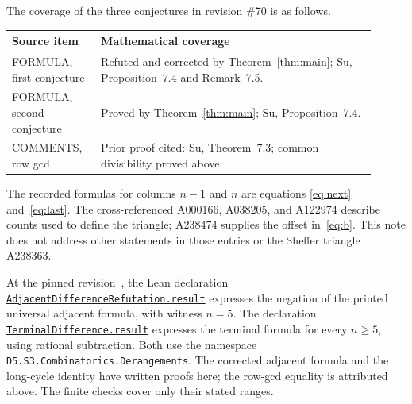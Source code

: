 \documentclass[11pt]{article}
\begin{document}
The coverage of the three conjectures in revision \#70 is as follows.
\begin{center}
\small
\begin{tabular}{p{0.22\linewidth}p{0.69\linewidth}}
\toprule
Source item & Mathematical coverage\\
\midrule
FORMULA, first conjecture & Refuted and corrected by Theorem~\ref{thm:main};
Su, Proposition~7.4 and Remark~7.5.\\
FORMULA, second conjecture & Proved by Theorem~\ref{thm:main};
Su, Proposition~7.4.\\
COMMENTS, row gcd & Prior proof cited: Su, Theorem~7.3;
common divisibility proved above.\\
\bottomrule
\end{tabular}
\end{center}
The recorded formulas for columns $n-1$ and $n$ are equations
\eqref{eq:next} and~\eqref{eq:last}. The cross-referenced A000166,
A038205, and A122974 describe counts used to define the triangle;
A238474 supplies the offset in~\eqref{eq:b}. This note does not address
other statements in those entries or the Sheffer triangle A238363.

At the pinned revision~\cite{lean}, the Lean declaration
\href{https://github.com/the-omega-institute/trureturing/blob/cdafeab0d44da2b6840cfc802535d2f94a146fad/D5/S3/Combinatorics/Derangements/AdjacentDifferenceRefutation.lean}{\texttt{AdjacentDifferenceRefutation.result}}
expresses the negation of the printed universal adjacent formula, with witness
$n=5$. The declaration
\href{https://github.com/the-omega-institute/trureturing/blob/cdafeab0d44da2b6840cfc802535d2f94a146fad/D5/S3/Combinatorics/Derangements/TerminalDifference.lean}{\texttt{TerminalDifference.result}}
expresses the terminal formula for every $n\geq5$, using rational subtraction.
Both use the namespace \texttt{D5.S3.Combinatorics.Derangements}.
The corrected adjacent formula and the long-cycle identity have written
proofs here; the row-gcd equality is attributed above. The finite checks
cover only their stated ranges.
\end{document}
